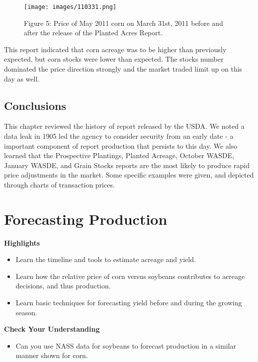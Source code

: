 \documentclass[
]{book}
\providecommand{\tightlist}{%
  \setlength{\itemsep}{0pt}\setlength{\parskip}{0pt}}
\begin{document}
\begin{figure}
\centering
\texttt{[image: images/110331.png]}
\caption{Figure 5: Price of May 2011 corn on March 31st, 2011 before and after the release of the Planted Acres Report.}
\end{figure}

This report indicated that corn acreage was to be higher than previously expected, but corn stocks were lower than expected. The stocks number dominated the price direction strongly and the market traded limit up on this day as well.

\hypertarget{conclusions}{%
\section{Conclusions}\label{conclusions}}

This chapter reviewed the history of report released by the USDA. We noted a data leak in 1905 led the agency to consider security from an early date - a important component of report production that persists to this day. We also learned that the Prospective Plantings, Planted Acreage, October WASDE, January WASDE, and Grain Stocks reports are the most likely to produce rapid price adjustments in the market. Some specific examples were given, and depicted through charts of transaction prices.

\hypertarget{forecasting-production}{%
\chapter{Forecasting Production}\label{forecasting-production}}

\textbf{Highlights}

\begin{itemize}
\tightlist
\item
  Learn the timeline and tools to estimate acreage and yield.
\item
  Learn how the relative price of corn versus soybeans contributes to acreage decisions, and thus production.
\item
  Learn basic techniques for forecasting yield before and during the growing season.
\end{itemize}

\textbf{Check Your Understanding}

\begin{itemize}
\tightlist
\item
  Can you use NASS data for soybeans to forecast production in a similar manner shown for corn.
\end{itemize}
\end{document}
